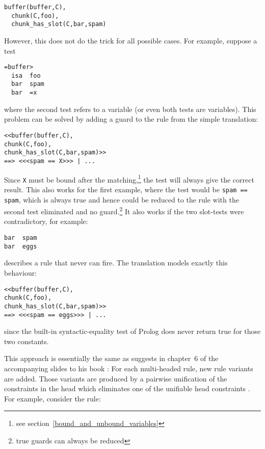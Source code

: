 \begin{lstlisting}
buffer(buffer,C),
  chunk(C,foo),
  chunk_has_slot(C,bar,spam)
\end{lstlisting}

However, this does not do the trick for all possible cases. For example, suppose a test

\begin{lstlisting}
=buffer>
  isa  foo
  bar  spam
  bar  =x
\end{lstlisting}

where the second test refers to a variable (or even both tests are variables). This problem can be solved by adding a guard to the rule from the simple translation:

\begin{lstlisting}
<<buffer(buffer,C),
chunk(C,foo),
chunk_has_slot(C,bar,spam)>>
==> <<<spam == X>>> | ...
\end{lstlisting}

Since \lstinline|X| must be bound after the matching,\footnote{see section~\ref{bound_and_unbound_variables}} the test will always give the correct result. This also works for the first example, where the test would be \lstinline|spam == spam|, which is always true and hence could be reduced to the rule with the second test eliminated and no guard.\footnote{true guards can always be reduced} It also works if the two slot-tests were contradictory, for example: 

\begin{lstlisting}
bar  spam
bar  eggs
\end{lstlisting}

describes a rule that never can fire. The translation models exactly this behaviour:

\begin{lstlisting}
<<buffer(buffer,C),
chunk(C,foo),
chunk_has_slot(C,bar,spam)>>
==> <<<spam == eggs>>> | ...
\end{lstlisting}

since the built-in syntactic-equality test of Prolog does never return true for those two constants.

This approach is essentially the same as \citeauthor{chr_lecture_chap6} suggests in chapter~6 of the accompanying slides to his book \cite{fru_chr_book_2009}: For each multi-headed rule, new rule variants are added. Those variants are produced by a pairwise unification of the constraints in the head which eliminates one of the unifiable head constraints \cite{chr_lecture_chap6}. For example, consider the rule:

